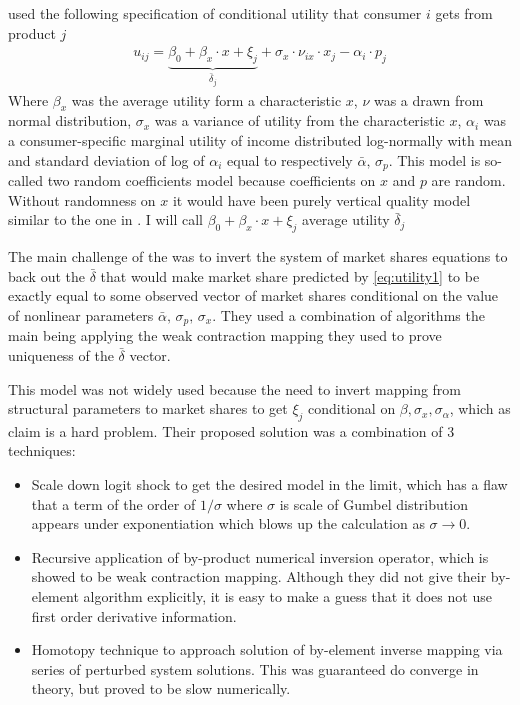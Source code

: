 \documentclass[12pt,letterpaper]{article}
\begin{document}
	\cite{berry2007pure} used the following specification of conditional utility that consumer $i$ gets from product $j$ 
	\begin{align}
	u_{ij} = \underbrace{\beta_0 + \beta_x\cdot x+ \xi_j}_{\bar \delta_j} + \sigma_x \cdot \nu_{ix} \cdot x_j - \alpha_i\cdot p_j
	\label{eq:utility1}
	\end{align}
	Where $\beta_x$ was the average utility form a characteristic $x$, $\nu$ was a drawn from normal distribution, $\sigma_x$ was a variance of utility from the characteristic $x$, $\alpha_i$ was a consumer-specific marginal utility of income distributed log-normally with mean and standard deviation of log of $\alpha_i$ equal to respectively $\bar{\alpha},\, \sigma_p$. This model is so-called two random coefficients model because coefficients on $x$ and $p$ are random. Without randomness on $x$ it would have been purely vertical quality model similar to the one in \cite{bresnahan1990entry}. I will call $\beta_0 + \beta_x\cdot x+ \xi_j$ average utility $\bar \delta_j$
	
	The main challenge of the \cite{berry2007pure} was to invert the system of market shares equations to back out the $\bar\delta$ that would make market share predicted by \ref{eq:utility1} to be exactly equal to some observed vector of market shares conditional on the value of nonlinear parameters $\bar{\alpha},\, \sigma_p,\, \sigma_x$. They used a combination of algorithms the main being applying the weak contraction mapping they used to prove uniqueness of the $\bar \delta$ vector.
	
	This model was not widely used because the need to invert mapping from structural parameters to market shares to get $\xi_j$ conditional on $\beta, \sigma_x, \sigma_\alpha$, which as \cite{berry2007pure} claim is a hard problem. Their proposed solution was a combination of 3 techniques: 
	\begin{itemize}
	\item Scale down logit shock to get the desired model in the limit, which has a flaw that a term of the order of $1/\sigma$ where $\sigma$ is scale of Gumbel distribution appears under exponentiation which blows up the calculation as $\sigma \to 0$.
	\item Recursive application of by-product numerical inversion operator, which is showed to be weak contraction mapping. Although they did not give their by-element algorithm explicitly, it is easy to make a guess that it does not use first order derivative information. 
	\item Homotopy technique to approach solution of by-element inverse mapping via series of perturbed system solutions. This was guaranteed do converge in theory, but proved to be slow numerically.
	\end{itemize}
	
\end{document}
